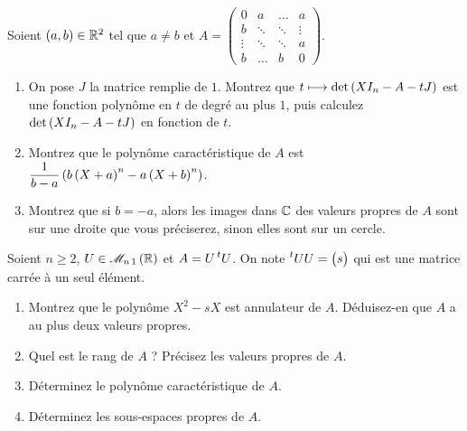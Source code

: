 \begin{exoss}[Exercice 6]
Soient \(\left(a,b\right)\in\mathbb{R}^2\) tel que \(a\not=b\) et \(A=\begin{pmatrix}
0 & a & \dots & a \\
b & \ddots & \ddots & \vdots \\
\vdots & \ddots & \ddots & a \\
b & \dots & b & 0
\end{pmatrix}\).

\begin{enumerate}
    \item On pose \(J\) la matrice remplie de \(1\). Montrez que \(t\longmapsto\det\left(XI_n-A-tJ\right)\) est une fonction polynôme en \(t\) de degré au plus \(1\), puis calculez \(\det\left(XI_n-A-tJ\right)\) en fonction de \(t\). \\
    \item Montrez que le polynôme caractéristique de \(A\) est \(\dfrac{1}{b-a}\left(b\left(X+a\right)^n-a\left(X+b\right)^n\right)\). \\
    \item Montrez que si \(b=-a\), alors les images dans \(\mathbb{C}\) des valeurs propres de \(A\) sont sur une droite que vous préciserez, sinon elles sont sur un cercle.
\end{enumerate}
\end{exoss}



\begin{exoss}[Exercice 7]
Soient \(n\geq2\), \(U\in\M{n\,1}[\R]\) et \(A=U\prescript{t}{}{U}\). On note \(\prescript{t}{}{U}U=\begin{pmatrix}
s
\end{pmatrix}\) qui est une matrice carrée à un seul élément.

\begin{enumerate}
    \item Montrez que le polynôme \(X^2-sX\) est annulateur de \(A\). Déduisez-en que \(A\) a au plus deux valeurs propres. \\
    \item Quel est le rang de \(A\) ? Précisez les valeurs propres de \(A\). \\
    \item Déterminez le polynôme caractéristique de \(A\). \\
    \item Déterminez les sous-espaces propres de \(A\).
\end{enumerate}
\end{exoss}



